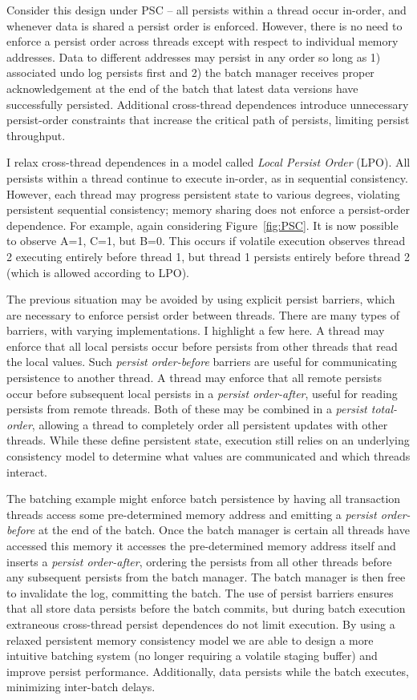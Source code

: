 Consider this design under PSC -- all persists within a thread occur in-order, and whenever data is shared a persist order is enforced.
However, there is no need to enforce a persist order across threads except with respect to individual memory addresses.
Data to different addresses may persist in any order so long as 1) associated undo log persists first and 2) the batch manager receives proper acknowledgement at the end of the batch that latest data versions have successfully persisted.
Additional cross-thread dependences introduce unnecessary persist-order constraints that increase the critical path of persists, limiting persist throughput.

I relax cross-thread dependences in a model called \emph{Local Persist Order} (LPO).
All persists within a thread continue to execute in-order, as in sequential consistency.
However, each thread may progress persistent state to various degrees, violating persistent sequential consistency; memory sharing does not enforce a persist-order dependence.
For example, again considering Figure~\ref{fig:PSC}.
It is now possible to observe A=1, C=1, but B=0.
This occurs if volatile execution observes thread 2 executing entirely before thread 1, but thread 1 persists entirely before thread 2 (which is allowed according to LPO).

The previous situation may be avoided by using explicit persist barriers, which are necessary to enforce persist order between threads.
There are many types of barriers, with varying implementations.
I highlight a few here.
A thread may enforce that all local persists occur before persists from other threads that read the local values.
Such \emph{persist order-before} barriers are useful for communicating persistence to another thread.
A thread may enforce that all remote persists occur before subsequent local persists in a \emph{persist order-after}, useful for reading persists from remote threads.
Both of these may be combined in a \emph{persist total-order}, allowing a thread to completely order all persistent updates with other threads.
While these define persistent state, execution still relies on an underlying consistency model to determine what values are communicated and which threads interact.

The batching example might enforce batch persistence by having all transaction threads access some pre-determined memory address and emitting a \emph{persist order-before} at the end of the batch.
Once the batch manager is certain all threads have accessed this memory it accesses the pre-determined memory address itself and inserts a \emph{persist order-after}, ordering the persists from all other threads before any subsequent persists from the batch manager.
The batch manager is then free to invalidate the log, committing the batch.
The use of persist barriers ensures that all store data persists before the batch commits, but during batch execution extraneous cross-thread persist dependences do not limit execution.
By using a relaxed persistent memory consistency model we are able to design a more intuitive batching system (no longer requiring a volatile staging buffer) and improve persist performance.
Additionally, data persists while the batch executes, minimizing inter-batch delays.

